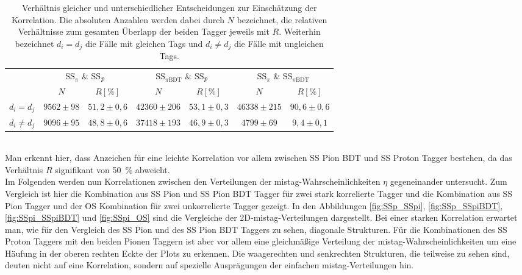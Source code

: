 \begin{table}[htbp]
	\centering
	\small
	\caption{Verhältnis gleicher und unterschiedlicher Entscheidungen zur Einschätzung der Korrelation. Die absoluten Anzahlen werden dabei durch $N$ bezeichnet, die relativen Verhältnisse zum gesamten Überlapp der beiden Tagger jeweils mit $R$. Weiterhin bezeichnet $d_i=d_j$ die Fälle mit gleichen Tags und $d_i\neq d_j$ die Fälle mit ungleichen Tags.}
	\label{tab:overlap}
	\begin{tabular}{ccccccc}
	\toprule
         			& \multicolumn{2}{c}{SS$_\pi$ \& SS$_{p}$} & \multicolumn{2}{c}{SS$_{\pi\text{BDT}}$ \& SS$_{p}$} & \multicolumn{2}{c}{SS$_\pi$ \& SS$_{\pi\text{BDT}}$} \\  
        				& $N$ & $R \si{ [\percent]}$ & $N$ & $R \si{ [\percent]}$ & $N$ & $R \si{ [\percent]}$ \\ 
				\midrule
       $d_i=d_j$	& $9562\pm98$ & $51{,}2\pm0{,}6$ & $42360\pm206$ & $53{,}1\pm0{,}3$ &  $46338\pm215$  & $90{,}6\pm0{,}6$ \\ 
        $d_i\neq d_j$  & $9096\pm95$ & $48{,}8\pm0{,}6$ & $37418\pm193$ & $46{,}9\pm0{,}3$ & $4799\pm69$  & $9{,}4\pm0{,}1$ \\ 
        \bottomrule
	\end{tabular}
\end{table}\\
Man erkennt hier, dass Anzeichen für eine leichte Korrelation vor allem zwischen SS Pion BDT und SS Proton Tagger bestehen, da das Verhältnis $R$ signifikant von \SI{50}{\%} abweicht.\\
Im Folgenden werden nun Korrelationen zwischen den Verteilungen der mistag-Wahrscheinlichkeiten $\eta$ gegeneinander untersucht. Zum Vergleich ist hier  die Kombination aus SS Pion und SS Pion BDT Tagger für zwei stark korrelierte Tagger und die Kombination aus SS Pion Tagger und der OS Kombination für zwei unkorrelierte Tagger gezeigt. In den Abbildungen \ref{fig:SSp_SSpi}, \ref{fig:SSp_SSpiBDT}, \ref{fig:SSpi_SSpiBDT} und \ref{fig:SSpi_OS} sind die Vergleiche der 2D-mistag-Verteilungen dargestellt. Bei einer starken Korrelation erwartet man, wie für den Vergleich des SS Pion und des SS Pion BDT Taggers zu sehen, diagonale Strukturen. Für die Kombinationen des SS Proton Taggers mit den beiden Pionen Taggern ist aber vor allem eine gleichmäßige Verteilung der mistag-Wahrscheinlichkeiten um eine Häufung in der oberen rechten Eckte der Plots zu erkennen. Die waagerechten und senkrechten Strukturen, die teilweise zu sehen sind, deuten nicht auf eine Korrelation, sondern auf spezielle Ausprägungen der einfachen mistag-Verteilungen hin.
